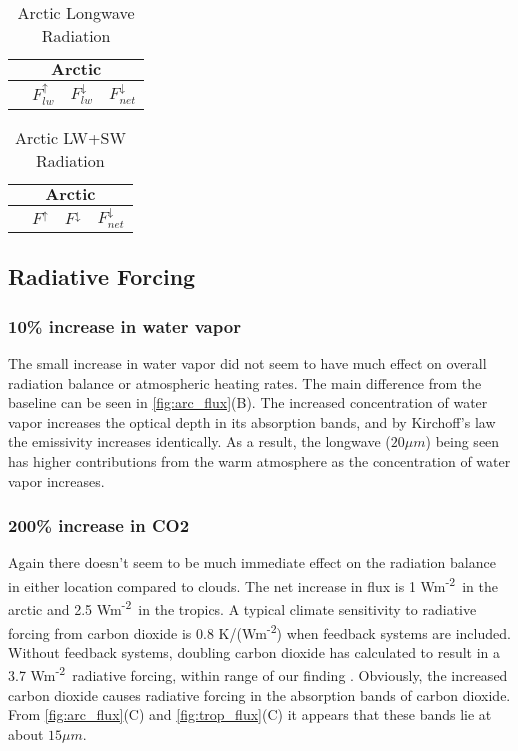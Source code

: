 \documentclass[twocol]{ametsoc}
\newcommand{\FU}{Wm\textsuperscript{-2}}
\begin{document}
\begin{table}[h]
    \centering
    \caption{Arctic Longwave Radiation}
    \label{tab:alr}
    \begin{tabular}{lccc}
        \toprule
        \multicolumn{4}{c}{$\textbf{Arctic}$}\\
        \midrule
        & $F^\uparrow_{lw}$ & $F^\downarrow_{lw}$ & $F^\downarrow_{net}$\\
        \midrule
        
        \bottomrule
    \end{tabular}

\end{table}

\begin{table}[h]
    \centering
    \caption{Arctic LW+SW Radiation}
    \label{tab:acr}
    \begin{tabular}{lccc}
        \toprule
        \multicolumn{4}{c}{$\textbf{Arctic}$}\\
        \midrule
        & $F^\uparrow$ & $F^\downarrow$ & $F^\downarrow_{net}$\\
        \midrule
        
        \bottomrule
    \end{tabular}

\end{table}

\subsection*{Radiative Forcing}
\subsubsection{10\% increase in water vapor}
The small increase in water vapor did not seem to have much effect on overall radiation balance or atmospheric heating rates. The main difference from the baseline can be seen in \autoref{fig:arc_flux}(B). The increased concentration of water vapor increases the optical depth in its absorption bands, and by Kirchoff’s law the emissivity increases identically. As a result, the longwave ($20\mu m$) being seen has higher contributions from the warm atmosphere as the concentration of water vapor increases.

\subsubsection{200\% increase in CO2}
Again there doesn’t seem to be much immediate effect on the radiation balance in either location compared to clouds. The net increase in flux is 1 \FU~in the arctic and 2.5 \FU~in the tropics. A typical climate sensitivity to radiative forcing from carbon dioxide is 0.8 K/(\FU) when feedback systems are included. Without feedback systems, doubling carbon dioxide has calculated to result in a 3.7 \FU~radiative forcing, within range of our finding \citep{rahmstorf:2008}.
Obviously, the increased carbon dioxide causes radiative forcing in the absorption bands of carbon dioxide. From \autoref{fig:arc_flux}(C) and \autoref{fig:trop_flux}(C) it appears that these bands lie at about $15\mu m$.
\end{document}
